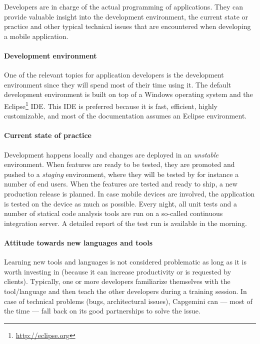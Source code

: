 Developers are in charge of the actual programming of applications. They can provide valuable insight into the development environment, the current state or practice and other typical technical issues that are encountered when developing a mobile application.

\paragraph{Development environment}

One of the relevant topics for application developers is the development environment since they will spend most of their time using it. The default development environment is built on top of a Windows operating system and the Eclipse\footnote{\url{http://eclipse.org}} IDE. This IDE is preferred because it is fast, efficient, highly customizable, and most of the documentation assumes an Eclipse environment.

\paragraph{Current state of practice}

Development happens locally and changes are deployed in an \emph{unstable}  environment. When features are ready to be tested, they are promoted and pushed to a \emph{staging} environment, where they will be tested by for instance a number of end users. When the features are tested and ready to ship, a new production release is planned. In case mobile devices are involved, the application is tested on the device as much as possible. Every night, all unit tests and a number of statical code analysis tools are run on a so-called continuous integration server. A detailed report of the test run is available in the morning.

\paragraph{Attitude towards new languages and tools} 

Learning new tools and languages is not considered problematic as long as it is worth investing in (because it can increase productivity or is requested by clients). Typically, one or more developers familiarize themselves with the tool/language and then teach the other developers during a training session. In case of technical problems (bugs, architectural issues), Capgemini can --- most of the time --- fall back on its good partnerships to solve the issue. 

